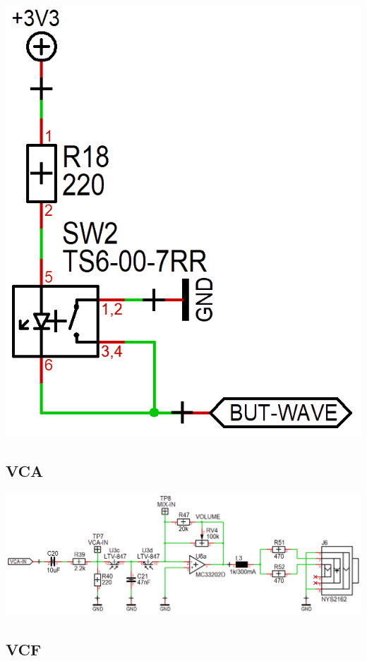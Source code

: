 \documentclass{scrartcl}
\begin{document}
\begin{center}
    \includegraphics[scale=0.25]{assets/schema-switch.png}
\end{center}

\subsection{VCA}

\begin{center}
    \includegraphics[scale=0.37]{assets/schema-vca.png}
\end{center}

\subsection{VCF}
\end{document}
